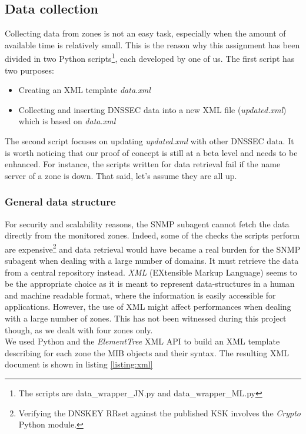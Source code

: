 \subsection{Data collection}
\label{section:data-collection}
Collecting data from zones is not an easy task, especially when the amount of available time is relatively small. This is the reason why this assignment has been divided in two Python scripts\footnote{The scripts are data\_wrapper\_JN.py and data\_wrapper\_ML.py}, each developed by one of us. The first script has two purposes:
\begin{itemize}
\item Creating an XML template \textit{data.xml}
\item Collecting and inserting DNSSEC data into a new XML file (\textit{updated.xml}) which is based on \textit{data.xml}
\end{itemize} 

\noindent The second script focuses on updating \textit{updated.xml} with other DNSSEC data. It is worth noticing that our proof of concept is still at a beta level and needs to be enhanced. For instance, the scripts written for data retrieval fail if the name server of a zone is down. That said, let's assume they are all up.

\subsubsection{General data structure}
For security and scalability reasons, the SNMP subagent cannot fetch the data directly from the monitored zones. Indeed, some of the checks the scripts perform are expensive\footnote{Verifying the DNSKEY RRset against the published KSK involves the \textit{Crypto} Python module.} and data retrieval would have became a real burden for the SNMP subagent when dealing with a large number of domains. It must retrieve the data from a central repository instead. \textit{XML} (EXtensible Markup Language) seems to be the appropriate choice as it is meant to represent data-structures in a human and machine readable format, where the information is easily accessible for applications. However, the use of XML might affect performances when dealing with a large number of zones. This has not been witnessed during this project though, as we dealt with four zones only.
\\
We used Python and the \textit{ElementTree} XML API\cite{et} to build an XML template describing for each zone the MIB objects and their syntax. The resulting XML document is shown in listing \ref{listing:xml}


